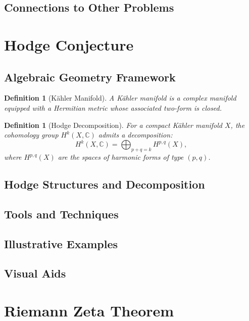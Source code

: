 \documentclass[12pt, a4paper]{article}
\theoremstyle{definitionstyle}
\newtheorem{definition}[theorem]{Definition}
\begin{document}
\subsection{Connections to Other Problems}

\section{Hodge Conjecture}
\subsection{Algebraic Geometry Framework}
\begin{definition}[Kähler Manifold]
A Kähler manifold is a complex manifold equipped with a Hermitian metric whose associated two-form is closed.
\end{definition}

\begin{definition}[Hodge Decomposition]
For a compact Kähler manifold $X$, the cohomology group $H^k(X, \mathbb{C})$ admits a decomposition:
\[
H^k(X, \mathbb{C}) = \bigoplus_{p+q=k} H^{p,q}(X),
\]
where $H^{p,q}(X)$ are the spaces of harmonic forms of type $(p,q)$.
\end{definition}

\subsection{Hodge Structures and Decomposition}

\subsection{Tools and Techniques}

\subsection{Illustrative Examples}

\subsection{Visual Aids}

\section{Riemann Zeta Theorem}
\end{document}
